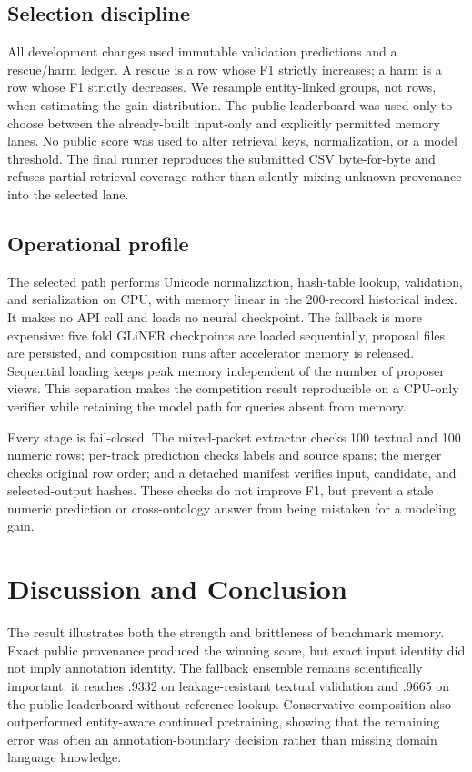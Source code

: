 \documentclass[11pt]{article}
\begin{document}
\subsection{Selection discipline}
All development changes used immutable validation predictions and a
rescue/harm ledger.  A rescue is a row whose F1 strictly increases; a harm is a
row whose F1 strictly decreases.  We resample entity-linked groups, not rows,
when estimating the gain distribution.  The public leaderboard was used only
to choose between the already-built input-only and explicitly permitted memory
lanes.  No public score was used to alter retrieval keys, normalization, or a
model threshold.  The final runner reproduces the submitted CSV byte-for-byte
and refuses partial retrieval coverage rather than silently mixing unknown
provenance into the selected lane.

\subsection{Operational profile}
The selected path performs Unicode normalization, hash-table lookup, validation,
and serialization on CPU, with memory linear in the 200-record historical
index.  It makes no API call and loads no neural checkpoint.  The fallback is
more expensive: five fold GLiNER checkpoints are loaded sequentially, proposal
files are persisted, and composition runs after accelerator memory is released.
Sequential loading keeps peak memory independent of the number of proposer
views.  This separation makes the competition result reproducible on a
CPU-only verifier while retaining the model path for queries absent from memory.

Every stage is fail-closed.  The mixed-packet extractor checks 100 textual and
100 numeric rows; per-track prediction checks labels and source spans; the
merger checks original row order; and a detached manifest verifies input,
candidate, and selected-output hashes.  These checks do not improve F1, but
prevent a stale numeric prediction or cross-ontology answer from being mistaken
for a modeling gain.

\section{Discussion and Conclusion}
The result illustrates both the strength and brittleness of benchmark memory. Exact public provenance produced the winning score, but exact input identity did not imply annotation identity. The fallback ensemble remains scientifically important: it reaches .9332 on leakage-resistant textual validation and .9665 on the public leaderboard without reference lookup. Conservative composition also outperformed entity-aware continued pretraining, showing that the remaining error was often an annotation-boundary decision rather than missing domain language knowledge.
\end{document}

